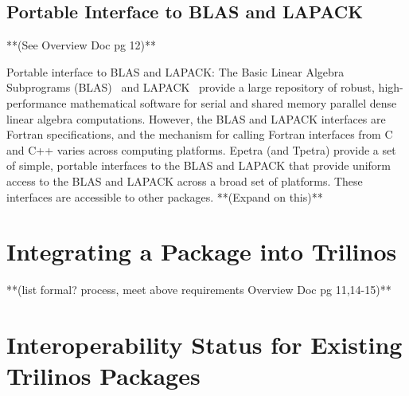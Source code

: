 \documentclass[12pt]{report}
\begin{document}
	\section{Portable Interface to BLAS and LAPACK}
	**(See Overview Doc pg 12)**

Portable interface to BLAS and LAPACK: The Basic Linear Algebra
Subprograms (BLAS)~\cite{BLAS1,BLAS2,BLAS3} and LAPACK~\cite{lapack}
provide a large repository of robust, high-performance mathematical
software for serial and shared memory parallel dense linear algebra
computations.  However, the BLAS and LAPACK interfaces are Fortran
specifications, and the mechanism for calling Fortran interfaces from
C and C++ varies across computing platforms.  Epetra (and Tpetra)
provide a set of simple, portable interfaces to the BLAS and LAPACK
that provide uniform access to the BLAS and LAPACK across a broad
set of platforms.  These interfaces are accessible to
other packages.
**(Expand on this)**


	\chapter{Integrating a Package into Trilinos}
	**(list formal? process, meet above requirements Overview Doc pg 11,14-15)**




	\chapter{Interoperability Status for Existing Trilinos Packages}


    \clearpage
    
    

\end{document}
